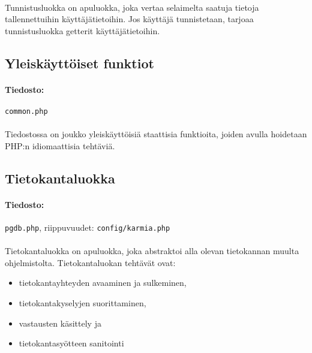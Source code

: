 \documentclass[11pt]{article}
\begin{document}
\paragraph{} Tunnistusluokka on apuluokka, joka vertaa selaimelta saatuja tietoja tallennettuihin käyttäjätietoihin. Jos käyttäjä tunnistetaan, tarjoaa tunnistusluokka getterit käyttäjätietoihin.


\subsection{Yleiskäyttöiset funktiot}

\paragraph{Tiedosto:} \large{\texttt{common.php}}

\paragraph{} Tiedostossa on joukko yleiskäyttöisiä staattisia funktioita, joiden avulla hoidetaan PHP:n idiomaattisia tehtäviä.


\subsection{Tietokantaluokka}

\paragraph{Tiedosto:} \large{\texttt{pgdb.php}}, riippuvuudet: \texttt{config/karmia.php}

\paragraph{} Tietokantaluokka on apuluokka, joka abstraktoi alla olevan tietokannan muulta ohjelmistolta. Tietokantaluokan tehtävät ovat:
\begin{itemize}
\item tietokantayhteyden avaaminen ja sulkeminen,
\item tietokantakyselyjen suorittaminen,
\item vastausten käsittely ja
\item tietokantasyötteen sanitointi
\end{itemize}
\end{document}
